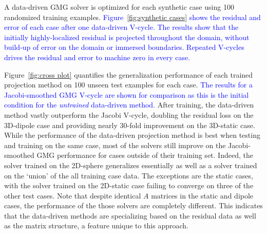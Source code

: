 \documentclass[]{elsarticle}
\begin{document}
A data-driven GMG solver is optimized for each synthetic case using 100 randomized training examples. \textcolor{blue}{Figure~\ref{fig:synthetic cases} shows the residual and error of each case after one data-driven V-cycle. The results show that the initially highly-localized residual is projected throughout the domain, without build-up of error on the domain or immersed boundaries. Repeated V-cycles drives the residual and error to machine zero in every case.} 

Figure~\ref{fig:cross plot} quantifies the generalization performance of each trained projection method on 100 unseen test examples for each case. \textcolor{blue}{The results for a Jacobi-smoothed GMG V-cycle are shown for comparison as this is the initial condition for the \textit{untrained} data-driven method.} After training, the data-driven method vastly outperform the Jacobi V-cycle, doubling the residual loss on the 3D-dipole case and providing nearly 30-fold improvement on the 3D-static case. While the performance of the data-driven projection method is best when testing and training on the same case, most of the solvers still improve on the Jacobi-smoothed GMG performance for cases outside of their training set. Indeed, the solver trained on the 2D-sphere generalizes essentially as well as a solver trained on the `union' of the all training case data. The exceptions are the static cases, with the solver trained on the 2D-static case failing to converge on three of the other test cases. Note that despite identical $A$ matrices in the static and dipole cases, the performance of the those solvers are completely different. This indicates that the data-driven methods are specializing based on the residual data as well as the matrix structure, a feature unique to this approach.
\end{document}
